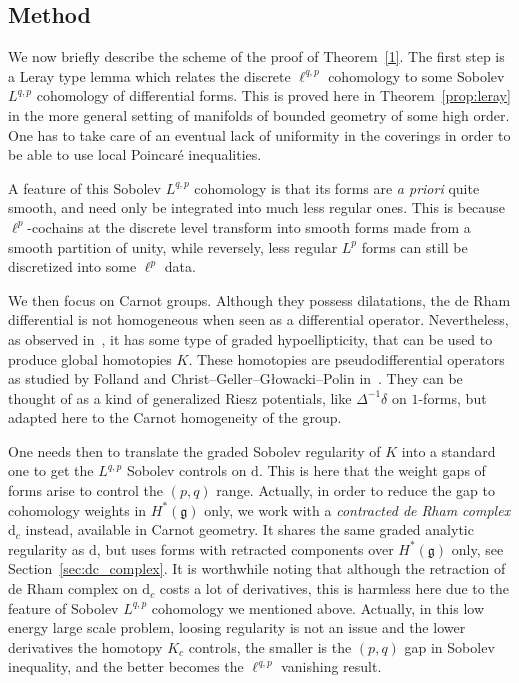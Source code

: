 \documentclass[11pt]{article}
\theoremstyle{definition}
\numberwithin{equation}{section}
\numberwithin{figure}{section}
\numberwithin{table}{section}
\newcommand{\dd}{\mathrm{d}}
\begin{document}
\subsection{Method}\label{sec:method}

We now briefly describe the scheme of the proof of Theorem~\ref{1}. The first step is a Leray type lemma which relates the discrete $\ell^{q,p}$ cohomology to some Sobolev $L^{q,p}$ cohomology of differential forms. This is proved here in Theorem~\ref{prop:leray} in the more general setting of manifolds of bounded geometry of some high order. One has to take care of an eventual lack of uniformity in the coverings in order to be able to use local Poincar\'e inequalities.

A feature of this Sobolev $L^{q,p}$ cohomology is that its forms are
\emph{a priori} quite smooth, and need only be integrated into much less regular ones. This is because $\ell^p$-cochains at the discrete level transform into smooth forms made from a smooth partition of unity, while reversely, less regular $L^p$ forms can still be discretized into some $\ell^p$ data.

We then focus on Carnot groups. Although they possess dilatations, the de Rham differential is not homogeneous when seen as a differential operator. Nevertheless, as observed in~\cite{Rumin_CRAS_1999}, it has some type of graded hypoellipticity, that can be used to produce global homotopies $K$. These homotopies are pseudodifferential operators as studied by Folland and Christ--Geller--G{\l}owacki--Polin in~\cite{CGGP,Folland_1975}. They can be thought of as a kind of generalized Riesz potentials, like $\Delta^{-1}\delta$ on $1$-forms, but adapted here to the Carnot homogeneity of the group.

One needs then to translate the graded Sobolev regularity of $K$ into a standard one to get the $L^{q,p}$ Sobolev controls on $\dd$. This is here that the weight gaps of forms arise to control the $(p,q)$ range. Actually, in order to reduce the gap to cohomology weights in $H^*(\mathfrak{g})$ only, we work with a \emph{contracted de Rham complex} $\dd_c$ instead, available in Carnot geometry. It shares the same graded analytic regularity as $\dd$, but uses forms with retracted components over $H^*(\mathfrak{g})$ only, see Section~\ref{sec:dc_complex}. It is worthwhile noting that although the retraction of de Rham complex on $\dd_c$ costs a lot of derivatives, this is harmless here due to the feature of Sobolev $L^{q,p}$ cohomology we mentioned above. Actually, in this low energy large scale problem, loosing regularity is not an issue and the lower derivatives the homotopy $K_c$ controls, the smaller is the $(p,q)$ gap in Sobolev inequality, and the better becomes the $\ell^{q,p}$ vanishing result.
\end{document}
